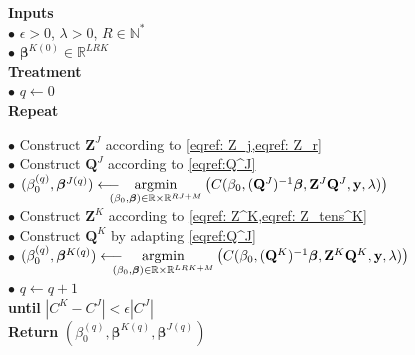 \documentclass[preprint,12pt]{elsarticle}
\begin{document}
\begin{mdframed}[leftmargin=0cm, rightmargin=4cm]
    \noindent \textbf{Inputs}\\
    \phantom{a}\hspace{5 pt} $\bullet$ $\epsilon >0$, $\lambda >0$, $R \in \mathbb{N}^{*}$\\[2 pt]
    \phantom{a}\hspace{5 pt} $\bullet$ $\bm{\beta}^{K(0)} \in \mathbb{R}^{LRK}$\\[4 pt]
    \textbf{Treatment}\\
    \phantom{a}\hspace{5 pt} $\bullet$ $q \leftarrow 0$\\[2 pt]
    \phantom{a}\hspace{5 pt}  \textbf{Repeat}\\[2 pt]
    \phantom{a}\hspace{22 pt} $\bullet$ Construct $\mathbf{Z}^J$ according to \cref{eqref: Z_j,eqref: Z_r}\\[2 pt]
    \phantom{a}\hspace{25 pt} $\bullet$ Construct $\mathbf{Q}^J$ according to \cref{eqref:Q^J}\\[2 pt]
    \phantom{a}\hspace{25 pt}  $\bullet$ $(\beta_0^{(q)}, \bm{\beta}^{J {(q)}}) \longleftarrow \hspace{-10 pt} \underset{(\beta_0, \bm{\beta}) \in \mathbb{R} \times \mathbb{R}^{RJ + M}}{\text{argmin}} \left( C(\beta_0, (\mathbf{Q}^J)^{-1}\bm{\beta},\mathbf{Z}^J \mathbf{Q}^J, \mathbf{y}, \lambda) \right)$\\[2 pt]
    \phantom{a}\hspace{25 pt} $\bullet$ Construct $\mathbf{Z}^K$ according to \cref{eqref: Z^K,eqref: Z_tens^K}\\[3 pt]
    \phantom{a}\hspace{25 pt} $\bullet$ Construct $\mathbf{Q}^K$ by adapting \cref{eqref:Q^J}\\[2 pt]
    \phantom{a}\hspace{25 pt}  $\bullet$ $(\beta_0^{(q)}, \bm{\beta}^{K {(q)}}) \longleftarrow \hspace{-10 pt} \underset{(\beta_0, \bm{\beta}) \in \mathbb{R} \times \mathbb{R}^{LRK + M}}{\text{argmin}} \left( C(\beta_0, (\mathbf{Q}^K)^{-1}\bm{\beta},\mathbf{Z}^K \mathbf{Q}^K, \mathbf{y}, \lambda) \right)$\\[2 pt]
    \phantom{a}\hspace{25 pt}  $\bullet$ $q \leftarrow q + 1$\\[4 pt]
    \phantom{a}\hspace{8 pt}  \textbf{until} $|C^K - C^J| < \epsilon |C^J| $\\[4 pt]
    \textbf{Return} $(\beta_0^{(q)},\bm{\beta}^{K(q)}, \bm{\beta}^{J(q)})$
\end{mdframed}
\end{document}

